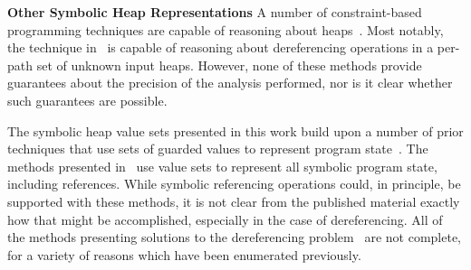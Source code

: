 \noindent\textbf{Other Symbolic Heap Representations}
%
A number of constraint-based programming techniques are capable of reasoning about heaps~\cite{Degrave:2010,Charreteur:2009,Albert:2013}. Most notably, the technique in~\cite{Albert:2013} is capable of reasoning about dereferencing operations in a per-path set of unknown input heaps. However, none of these methods provide guarantees about the precision of the analysis performed, nor is it clear whether such guarantees are possible.

The symbolic heap value sets presented in this work build upon a number of prior techniques that use sets of guarded values to represent program state~\cite{Sen:2014,Torlak:2014,Yorsh:2008,Xie:2005,Dillig:2011,Elkarablieh:2009}. The methods presented in~\cite{Sen:2014,Torlak:2014,Yorsh:2008} use value sets to represent all symbolic program state, including references. While symbolic referencing operations could, in principle, be supported with these methods, it is not clear from the published material exactly how that might be accomplished, especially in the case of dereferencing. All of the methods presenting solutions to the dereferencing problem~\cite{Xie:2005,Dillig:2011,Elkarablieh:2009} are not complete, for a variety of reasons which have been enumerated previously.


